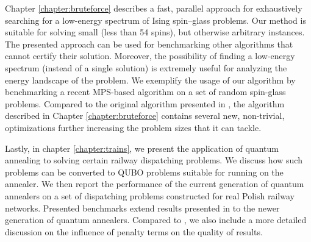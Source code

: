 Chapter \ref{chapter:bruteforce} describes a fast, parallel approach for
exhaustively searching for a low-energy spectrum of Ising spin--glass problems.
Our method is suitable for solving small (less than 54 spins), but otherwise
arbitrary instances. The presented approach can be used for benchmarking other
algorithms that cannot certify their solution. Moreover, the possibility of
finding a low-energy spectrum (instead of a single solution) is extremely
useful for analyzing the energy landscape of the problem. We exemplify the
usage of our algorithm by benchmarking a recent MPS-based algorithm on a set of
random spin-glass problems. Compared to the original algorithm presented in
\cite{bruteforce}, the algorithm described in Chapter \ref{chapter:bruteforce}
contains several new, non-trivial, optimizations further increasing the problem
sizes that it can tackle.

Lastly, in chapter \ref{chapter:trains}, we present the application of quantum
annealing to solving certain railway dispatching problems. We discuss how such
problems can be converted to QUBO problems suitable for running on the
annealer. We then report the performance of the current generation of quantum
annealers on a set of dispatching problems constructed for real Polish railway
networks. Presented benchmarks extend results presented in \cite{trains} to the
newer generation of quantum annealers. Compared to \cite{trains}, we also
include a more detailed discussion on the influence of penalty terms on the
quality of results.
